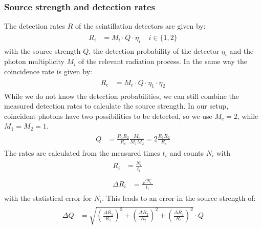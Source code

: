 \subsubsection{Source strength and detection rates}
%
The detection rates $R$ of the scintillation detectors are given by:
%
\begin{align}
    \label{eq:DetectionRates}
    \begin{split}
        R_i &= M_i \cdot Q \cdot \eta_i ~~~~~ i \in \{1,2\}
    \end{split}
\end{align}
%
with the source strength $Q$, the detection probability of the detector $\eta_i$ and the photon multiplicity $M_i$ of the relevant radiation process.
In the same way the coincidence rate is given by:
%
\begin{align}
    \label{eq:CoincidenceDetectionRates}
    \begin{split}
        R_{\text{c}} &= M_{\text{c}} \cdot Q \cdot \eta_1 \cdot \eta_2
    \end{split}
\end{align}
%
While we do not know the detection probabilities, we can still combine the measured detection rates to calculate the source strength.
In our setup, coincident photons have two possibilities to be detected, so we use $M_{\text{c}} = 2$, while $M_1 = M_2 = 1$.
%
\begin{align}
    \label{eq:SourceStrength}
    \begin{split}
        Q &= \frac{R_1 R_2}{R_{\text{c}}} \frac{ M_{\text{c}}}{M_1 M_2} = 2 \frac{R_1 R_2}{R_{\text{c}}}
    \end{split}
\end{align}
%
The rates are calculated from the measured times $t_i$ and counts $N_i$ with
%
\begin{align}
    \label{eq:RateMeasured}
    \begin{split}
        R_i  &= \frac{N_i}{t_i}
    \end{split}
    \\
    \label{eq:DeltaRateMeasured}
    \begin{split}
        \Delta R_i &= \frac{\sqrt{N_i}}{t_i}
    \end{split}
\end{align}
%
with the statistical error for $N_i$.
This leads to an error in the source strength of:
%
\begin{align}
    \label{eq:DeltaSourceStrength}
    \begin{split}
        \Delta Q &= \sqrt{ \left ( \frac{\Delta R_1}{R_1} \right ) ^2 +
                           \left ( \frac{\Delta R_2}{R_2} \right ) ^2 +
                           \left ( \frac{\Delta R_{\text{c}}}{R_{\text{c}}} \right ) ^2 } \cdot Q
    \end{split}
\end{align}
